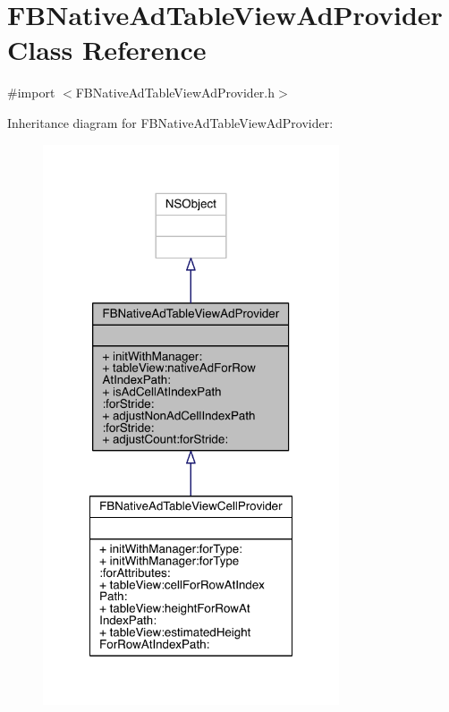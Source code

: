 \hypertarget{interface_f_b_native_ad_table_view_ad_provider}{\section{F\-B\-Native\-Ad\-Table\-View\-Ad\-Provider Class Reference}
\label{interface_f_b_native_ad_table_view_ad_provider}
}


{\ttfamily \#import $<$F\-B\-Native\-Ad\-Table\-View\-Ad\-Provider.\-h$>$}



Inheritance diagram for F\-B\-Native\-Ad\-Table\-View\-Ad\-Provider\-:
\nopagebreak
\begin{figure}[H]
\begin{center}
\leavevmode
\includegraphics[width=248pt]{interface_f_b_native_ad_table_view_ad_provider__inherit__graph}
\end{center}
\end{figure}


